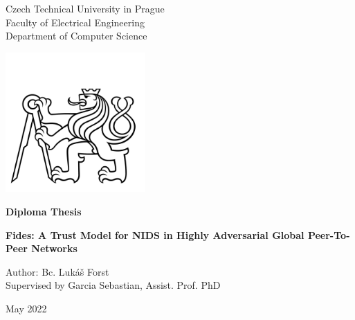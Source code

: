 

\begin{titlepage}
    \begin{center}
        
        \LARGE
        Czech Technical University in Prague\\
        Faculty of Electrical Engineering\\
        Department of Computer Science
        
        \includegraphics[width=0.4\textwidth]{assets/ctu_blackwhite.jpg}

        \Large
        \textbf{Diploma Thesis}
        
        \vfill
        
        \vspace*{0.5cm}
        \LARGE
        \textbf{Fides: A Trust Model for NIDS in Highly Adversarial Global Peer-To-Peer Networks}
        

        \vfill

        \large
        Author: Bc. Lukáš Forst \\
        Supervised by Garcia Sebastian, Assist. Prof. PhD
        
        \vspace{0.8cm}

        \Large
        May 2022

    \end{center}
\end{titlepage}

\thispagestyle{empty}
\cleardoublepage